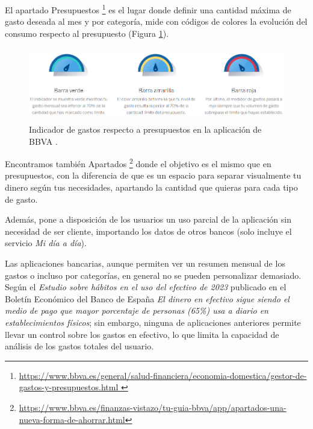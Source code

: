 \begin{itemize}
    El apartado Presupuestos \footnote{\url{https://www.bbva.es/general/salud-financiera/economia-domestica/gestor-de-gastos-y-presupuestos.html }} 
    es el lugar donde definir una cantidad máxima de gasto deseada 
    al mes y por categoría, mide con códigos de colores la evolución del consumo 
    respecto al presupuesto (Figura \ref{fig:indicador_presupuestos_BBVA}).
    
    \begin{figure}[ht!]
    \centering
    \includegraphics[height = 32mm]{imagenes/indicador_presupuestos_BBVA.png}
    \caption{Indicador de gastos respecto a presupuestos en la aplicación de BBVA
    \cite{presupuestos-BBVA}.}
    \label{fig:indicador_presupuestos_BBVA}
    \end{figure}

    Encontramos también Apartados 
    \footnote{\url{https://www.bbva.es/finanzas-vistazo/tu-guia-bbva/app/apartados-una-nueva-forma-de-ahorrar.html}}
    donde el objetivo es el mismo que en presupuestos, con la diferencia de 
    que es un espacio para separar visualmente tu dinero según tus necesidades,
    apartando la cantidad que quieras para cada tipo de gasto.

    Además, pone a disposición de los usuarios un uso parcial de la aplicación sin necesidad 
    de ser cliente, importando los datos de otros bancos (solo incluye el 
    servicio \textit{Mi día a día}).

\end{itemize}

Las aplicaciones bancarias, aunque permiten ver un resumen mensual de los gastos o incluso por categorías, en general no se pueden personalizar demasiado. Según el \textit{Estudio sobre hábitos en el uso del efectivo de 2023} publicado en el Boletín Económico del Banco de España \textit{El dinero en efectivo sigue siendo el medio de pago que mayor porcentaje de personas (65\%) usa a diario en establecimientos físicos}\cite{2023estudio-efectivo}; sin embargo, ninguna de aplicaciones anteriores permite llevar un control sobre los gastos en efectivo, lo que limita la capacidad de análisis de los gastos totales del usuario.

